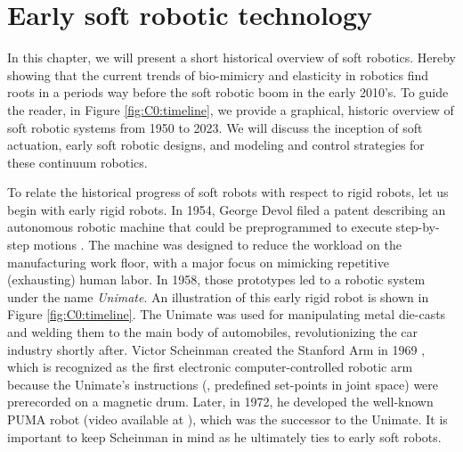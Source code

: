 \section{Early soft robotic technology}
In this chapter, we will present a short historical overview of soft robotics. Hereby showing that the current trends of bio-mimicry and elasticity in robotics find roots in a periods way before the soft robotic boom in the early 2010's. To guide the reader, in Figure \ref{fig:C0:timeline}, we provide a graphical, historic overview of soft robotic systems from 1950 to 2023. We will discuss the inception of soft actuation, early soft robotic designs, and modeling and control strategies for these continuum robotics.

To relate the historical progress of soft robots with respect to rigid robots, let us begin with early rigid robots. In 1954, George Devol filed a patent describing an autonomous robotic machine that could be preprogrammed to execute step-by-step motions \cite{Mickle2008}. The machine was designed to reduce the workload on the manufacturing work floor, with a major focus on mimicking repetitive (exhausting) human labor. In 1958, those prototypes led to a robotic system under the name \emph{Unimate}. An illustration of this early rigid robot is shown in Figure \ref{fig:C0:timeline}. The Unimate was used for manipulating metal die-casts and welding them to the main body of automobiles, revolutionizing the car industry shortly after. Victor Scheinman created the Stanford Arm in 1969 \cite{BibEntryStanford2022Sep,BibEntryOrm2019Sep}, which is recognized as the first electronic computer-controlled robotic arm because the Unimate's instructions (\ie, predefined set-points in joint space) were prerecorded on a magnetic drum. Later, in 1972, he developed the well-known PUMA robot (video available at \cite{BibEntryPuma2022Sep}), which was the successor to the Unimate. It is important to keep Scheinman in mind as he ultimately ties to early soft robots. \vspace{0.085em}

